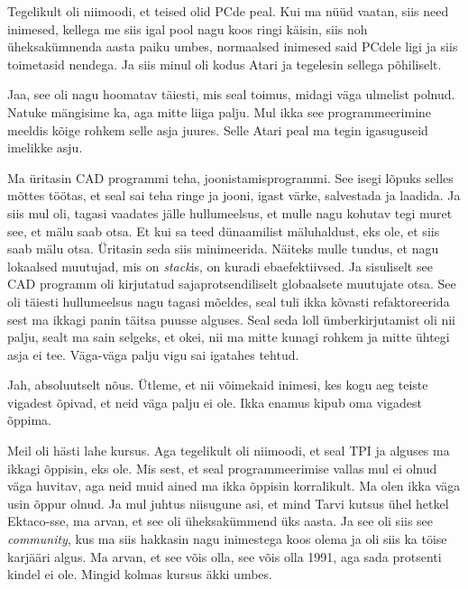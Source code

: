Tegelikult oli niimoodi, et teised olid PCde peal. Kui ma nüüd vaatan, siis 
need inimesed, kellega me siis igal pool nagu koos ringi käisin, siis noh 
üheksakümnenda aasta paiku umbes, normaalsed inimesed said PCdele ligi ja siis 
toimetasid nendega.  Ja siis minul oli kodus Atari  ja tegelesin sellega 
põhiliselt. 


Jaa, see oli nagu hoomatav täiesti,  mis seal toimus, midagi väga ulmelist 
polnud. Natuke mängisime ka, aga mitte liiga palju. Mul ikka see 
programmeerimine meeldis kõige rohkem selle asja juures. Selle Atari peal ma 
tegin igasuguseid imelikke asju.

Ma üritasin CAD programmi teha, joonistamisprogrammi. See isegi lõpuks selles 
mõttes töötas, et seal sai teha ringe ja jooni, igast värke, salvestada ja 
laadida. Ja siis mul oli, tagasi vaadates jälle hullumeelsus, et mulle nagu 
kohutav tegi muret see, et mälu saab otsa. Et kui sa teed dünaamilist 
mäluhaldust, eks ole, et siis saab mälu otsa. Üritasin seda siis minimeerida. 
Näiteks mulle tundus, et nagu lokaalsed muutujad, mis on \emph{stack}is, on 
kuradi ebaefektiivsed. Ja sisuliselt see CAD programm oli kirjutatud 
sajaprotsendiliselt globaalsete muutujate otsa. See oli täiesti hullumeelsus 
nagu tagasi mõeldes, seal tuli ikka kõvasti refaktoreerida sest ma ikkagi panin 
täitsa puusse alguses. Seal seda loll ümberkirjutamist oli nii palju, sealt ma 
sain selgeks, et okei, nii ma mitte kunagi rohkem ja mitte ühtegi asja ei tee. 
Väga-väga palju vigu sai igatahes tehtud.


Jah, absoluutselt nõus. Ütleme, et nii võimekaid inimesi, kes kogu aeg teiste 
vigadest õpivad, et neid väga palju ei ole. Ikka enamus kipub oma vigadest 
õppima. 


Meil oli hästi lahe kursus. Aga tegelikult oli niimoodi, et seal TPI ja alguses 
ma ikkagi õppisin, eks ole. Mis sest, et seal programmeerimise vallas mul ei 
olnud väga huvitav, aga neid muid ained ma ikka õppisin korralikult. Ma olen 
ikka väga usin õppur olnud. Ja mul juhtus niisugune asi, et mind 
Tarvi kutsus ühel hetkel Ektaco-sse, 
ma arvan, et see oli üheksakümmend üks aasta. Ja see oli siis see 
\emph{community}, kus ma siis hakkasin nagu inimestega koos olema ja oli siis 
ka töise karjääri algus. Ma arvan, et see võis olla, see võis olla 1991, aga  
sada protsenti kindel ei ole. Mingid kolmas kursus äkki umbes.

